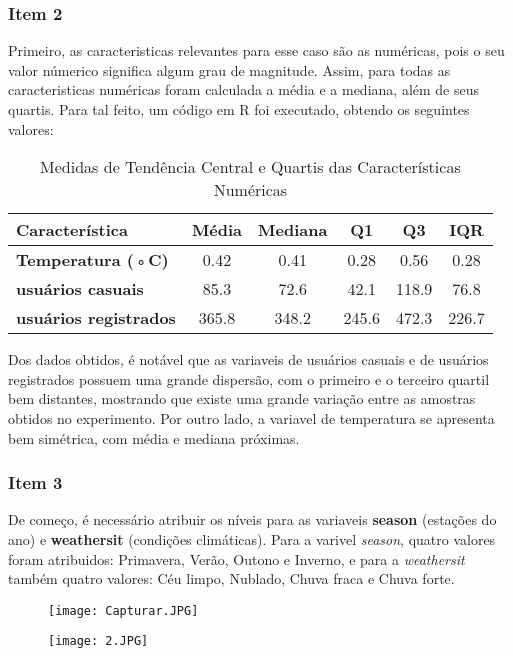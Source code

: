 \documentclass[a4paper,11pt]{article}
\begin{document}
\subsubsection{Item 2}

Primeiro, as caracteristicas relevantes para esse caso são as numéricas, pois o seu valor númerico significa algum grau de magnitude. Assim, para todas as caracteristicas numéricas foram calculada a média e a mediana, além de seus quartis. Para tal feito, um código em R foi executado, obtendo os seguintes valores:


\begin{table}[h]
\centering
\caption{Medidas de Tendência Central e Quartis das Características Numéricas}
\label{tab:estatisticas_descritivas}
\begin{tabular}{|l|c|c|c|c|c|}
\hline
\textbf{Característica} & \textbf{Média} & \textbf{Mediana} & \textbf{Q1} & \textbf{Q3} & \textbf{IQR} \\
\hline
\hline
\textbf{Temperatura (◦C)} & 0.42 & 0.41 & 0.28 & 0.56 & 0.28 \\
\hline
\textbf{usuários casuais} & 85.3 & 72.6 & 42.1 & 118.9 & 76.8 \\
\hline
\textbf{usuários registrados} & 365.8 & 348.2 & 245.6 & 472.3 & 226.7 \\
\hline
\end{tabular}
\end{table}

Dos dados obtidos, é notável que as variaveis de usuários casuais e de usuários registrados possuem uma grande dispersão, com o primeiro e o terceiro quartil bem distantes, mostrando que existe uma grande variação entre as amostras obtidos no experimento. Por outro lado, a variavel de temperatura se apresenta bem simétrica, com média e mediana próximas.

\newpage
\subsubsection{Item 3}
    De começo, é necessário atribuir os níveis para as variaveis \textbf{season} (estações do ano) e \textbf{weathersit} (condições climáticas). Para a varivel \textit{season}, quatro valores foram atribuidos: Primavera, Verão, Outono e Inverno, e para a \textit{weathersit} também quatro valores: Céu limpo, Nublado, Chuva fraca e Chuva forte.

   \begin{figure}[h!]
    \centering
    \begin{minipage}{0.45\textwidth}
        \centering
        \texttt{[image: Capturar.JPG]}
        \caption*{}
        \label{fig:fig1}
    \end{minipage}\hfill
    \begin{minipage}{0.45\textwidth}
        \centering
        \texttt{[image: 2.JPG]}
        \caption*{}
        \label{fig:fig2}
    \end{minipage}
\end{figure}
\end{document}
